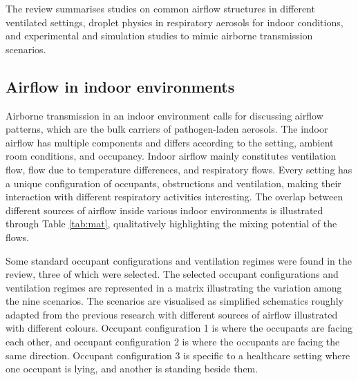 \documentclass[a4paper,12pt]{elsarticle}
\begin{document}
The review summarises studies on common airflow structures in different ventilated settings, droplet physics in respiratory aerosols for indoor conditions, and experimental and simulation studies to mimic airborne transmission scenarios.

\subsection{Airflow in indoor environments}

Airborne transmission in an indoor environment calls for discussing airflow patterns, which are the bulk carriers of pathogen-laden aerosols. The indoor airflow has multiple components and differs according to the setting, ambient room conditions, and occupancy. Indoor airflow mainly constitutes ventilation flow, flow due to temperature differences, and respiratory flows. Every setting has a unique configuration of occupants, obstructions and ventilation, making their interaction with different respiratory activities interesting. The overlap between different sources of airflow inside various indoor environments is illustrated through Table \ref{tab:mat}, qualitatively highlighting the mixing potential of the flows.

Some standard occupant configurations and ventilation regimes were found in the review, three of which were selected. The selected occupant configurations and ventilation regimes are represented in a matrix illustrating the variation among the nine scenarios. The scenarios are visualised as simplified schematics roughly adapted from the previous research with different sources of airflow illustrated with different colours. Occupant configuration 1 is where the occupants are facing each other, and occupant configuration 2 is where the occupants are facing the same direction. Occupant configuration 3 is specific to a healthcare setting where one occupant is lying, and another is standing beside them.
\end{document}
